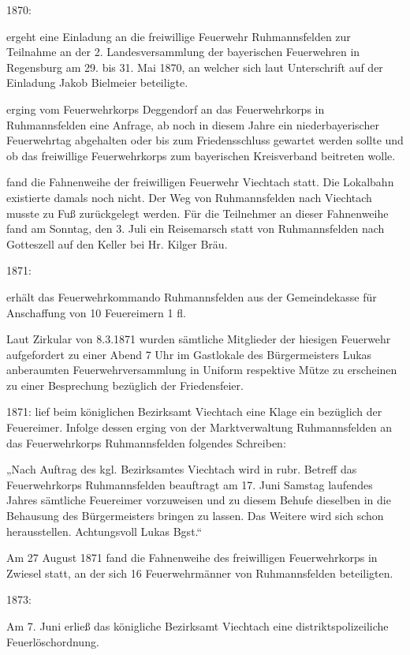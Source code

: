 \documentclass[12pt,a4paper]{book}
\begin{document}
1870:

ergeht eine Einladung an die freiwillige Feuerwehr Ruhmannsfelden zur Teilnahme
an der 2. Landesversammlung der bayerischen Feuerwehren in Regensburg am 29. bis
31. Mai 1870, an welcher sich laut Unterschrift auf der Einladung Jakob
Bielmeier beteiligte.

erging vom Feuerwehrkorps Deggendorf an das Feuerwehrkorps in Ruhmannsfelden
eine Anfrage, ab noch in diesem Jahre ein niederbayerischer Feuerwehrtag
abgehalten oder bis zum Friedensschluss gewartet werden sollte und ob das
freiwillige Feuerwehrkorps zum bayerischen Kreisverband beitreten wolle.

fand die Fahnenweihe der freiwilligen Feuerwehr Viechtach statt. Die Lokalbahn
existierte damals noch nicht. Der Weg von Ruhmannsfelden nach Viechtach musste
zu Fuß zurückgelegt werden. Für die Teilnehmer an dieser Fahnenweihe fand am
Sonntag, den 3. Juli ein Reisemarsch statt von Ruhmannsfelden nach Gotteszell
auf den Keller bei Hr. Kilger Bräu.

1871:

erhält das Feuerwehrkommando Ruhmannsfelden aus der Gemeindekasse für
Anschaffung von 10 Feuereimern 1 fl.

    Laut Zirkular von 8.3.1871 wurden sämtliche Mitglieder der hiesigen
    Feuerwehr aufgefordert zu einer Abend 7 Uhr im Gastlokale des Bürgermeisters
    Lukas anberaumten Feuerwehrversammlung in Uniform respektive Mütze zu
    erscheinen zu einer Besprechung bezüglich der Friedensfeier.

1871:   lief beim königlichen Bezirksamt Viechtach eine Klage ein bezüglich der
Feuereimer. Infolge dessen erging von der Marktverwaltung Ruhmannsfelden an das
Feuerwehrkorps Ruhmannsfelden folgendes Schreiben:

„Nach Auftrag des kgl. Bezirksamtes Viechtach wird in rubr. Betreff das
Feuerwehrkorps Ruhmannsfelden beauftragt am 17. Juni Samstag laufendes Jahres
sämtliche Feuereimer vorzuweisen und zu diesem Behufe dieselben in die Behausung
des Bürgermeisters bringen zu lassen. Das Weitere wird sich schon herausstellen.
Achtungsvoll Lukas Bgst.“

Am 27 August 1871 fand die Fahnenweihe des freiwilligen Feuerwehrkorps in
Zwiesel statt, an der sich 16 Feuerwehrmänner von Ruhmannsfelden beteiligten.

1873:

Am 7. Juni erließ das königliche Bezirksamt Viechtach eine distriktspolizeiliche
Feuerlöschordnung.
\end{document}
